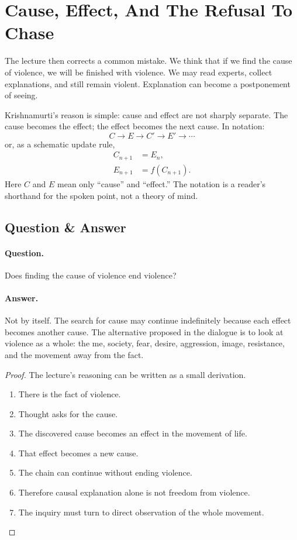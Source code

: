 \documentclass[11pt,oneside]{book}
\begin{document}
\section{Cause, Effect, And The Refusal To Chase}

The lecture then corrects a common mistake. We think that if we find the cause of violence, we will be finished with violence. We may read experts, collect explanations, and still remain violent. Explanation can become a postponement of seeing.

Krishnamurti's reason is simple: cause and effect are not sharply separate. The cause becomes the effect; the effect becomes the next cause. In notation:
\begin{equation}
C \longrightarrow E \longrightarrow C' \longrightarrow E' \longrightarrow \cdots
\end{equation}
or, as a schematic update rule,
\begin{align}
C_{n+1} &= E_n,\\
E_{n+1} &= f(C_{n+1}).
\end{align}
Here \(C\) and \(E\) mean only ``cause'' and ``effect.'' The notation is a reader's shorthand for the spoken point, not a theory of mind.

\subsection{Question \& Answer}

\paragraph{Question.}
Does finding the cause of violence end violence?

\paragraph{Answer.}
Not by itself. The search for cause may continue indefinitely because each effect becomes another cause. The alternative proposed in the dialogue is to look at violence as a whole: the me, society, fear, desire, aggression, image, resistance, and the movement away from the fact.

\begin{proof}
The lecture's reasoning can be written as a small derivation.
\begin{enumerate}
\item There is the fact of violence.
\item Thought asks for the cause.
\item The discovered cause becomes an effect in the movement of life.
\item That effect becomes a new cause.
\item The chain can continue without ending violence.
\item Therefore causal explanation alone is not freedom from violence.
\item The inquiry must turn to direct observation of the whole movement.
\end{enumerate}
\end{proof}
\end{document}
